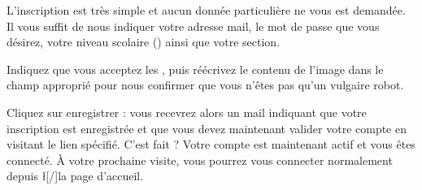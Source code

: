 ﻿L'inscription est très simple et aucun donnée particulière ne vous est demandée. Il vous suffit de nous indiquer votre adresse mail, le mot de passe que vous désirez, votre niveau scolaire () ainsi que votre section.

Indiquez que vous acceptez les , puis réécrivez le contenu de l'image dans le champ approprié pour nous confirmer que vous n'êtes pas qu'un vulgaire robot.

Cliquez sur enregistrer : vous recevrez alors un mail indiquant que votre inscription est enregistrée et que vous devez maintenant valider votre compte en visitant le lien spécifié.
C'est fait ? Votre compte est maintenant actif et vous êtes connecté. À votre prochaine visite, vous pourrez vous connecter normalement depuis \l[/]{la page d'accueil}.